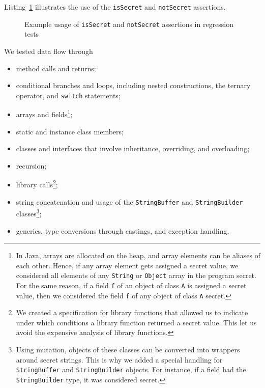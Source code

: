 \begin{mdelete}
\begin{example}
  Listing~\ref{list:assertions} illustrates the use of the \verb'isSecret' and \verb'notSecret' assertions.
\begin{figure}
  \centering
  \begin{minipage}{\textwidth}
  \end{minipage}
  \caption{Example usage of \texttt{isSecret} and \texttt{notSecret} assertions in regression tests}
  \label{list:assertions}
\end{figure}
\end{example}

We tested data flow through
\begin{itemize}
  \item method calls and returns;
  \item conditional branches and loops, including nested constructions, the ternary operator, and \verb'switch' statements;
  \item arrays and fields\footnote{%
    In Java, arrays are allocated on the heap, and array elements can be aliases of each other. 
    Hence, if any array element gets assigned a secret value, we considered all elements of any \texttt{String} or \texttt{Object} array in the program secret. 
    For the same reason, if a field \texttt{f} of an object of class \texttt{A} is assigned a secret value, then we considered the field \texttt{f} of any object of class \texttt{A} secret.%
  };
  \item static and instance class members;
  \item classes and interfaces that involve inheritance, overriding, and overloading;
  \item recursion;
  \item library calls\footnote{%
    We created a specification for library functions that allowed us to indicate under which conditions a library function returned a secret value. This let us avoid the expensive analysis of library functions.%
  };
  \item string concatenation and usage of the \texttt{StringBuffer} and \texttt{StringBuilder} classes\footnote{%
    Using mutation, objects of these classes can be converted into wrappers around secret strings. This is why we added a special handling for \texttt{StringBuffer} and \texttt{StringBuilder} objects. For instance, if a field had the  \texttt{StringBuilder} type, it was considered secret.%
  };
  \item generics, type conversions through castings, and exception handling.
\end{itemize}


\end{mdelete}
